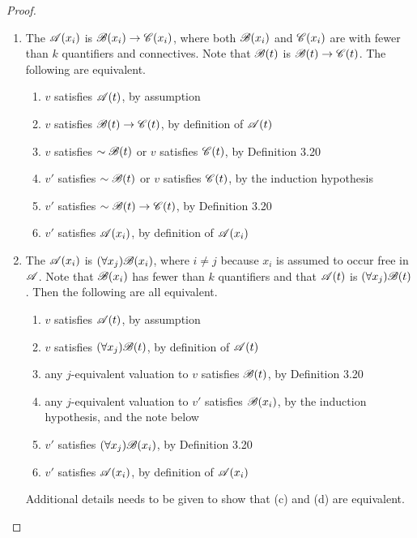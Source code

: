\begin{proposition}
\begin{proof}
\begin{enumerate}
        \item The \wf{} \(\mathscr{A}(x_i)\) is \(\mathscr{B}(x_i) \rightarrow \mathscr{C}(x_i)\), where both \(\mathscr{B}(x_i)\) and \(\mathscr{C}(x_i)\) are \wfs{} with fewer than \(k\) quantifiers and connectives. Note that \(\mathscr{B}(t)\) is \(\mathscr{B}(t) \rightarrow \mathscr{C}(t)\). The following are equivalent.
          \begin{enumerate}
            \item \(v\) satisfies \(\mathscr{A}(t)\), by assumption
            \item \(v\) satisfies \(\mathscr{B}(t) \rightarrow \mathscr{C}(t)\), by definition of \(\mathscr{A}(t)\)
            \item \(v\) satisfies \(\sim\mathscr{B}(t)\) or \(v\) satisfies \(\mathscr{C}(t)\), by Definition 3.20
            \item \(v'\) satisfies \(\sim\mathscr{B}(t)\) or \(v\) satisfies \(\mathscr{C}(t)\), by the induction hypothesis
            \item \(v'\) satisfies \(\sim\mathscr{B}(t) \rightarrow \mathscr{C}(t)\), by Definition 3.20
            \item \(v'\) satisfies \(\mathscr{A}(x_i)\), by definition of \(\mathscr{A}(x_i)\)
          \end{enumerate}

        \item The \wf{} \(\mathscr{A}(x_i)\) is \((\forall x_j)\mathscr{B}(x_i)\), where \(i \neq j\) because \(x_i\) is assumed to occur free in \(\mathscr{A}\). Note that \(\mathscr{B}(x_i)\) has fewer than \(k\) quantifiers and that \(\mathscr{A}(t)\) is \((\forall x_j)\mathscr{B}(t)\). Then the following are all equivalent.
          \begin{enumerate}
            \item \(v\) satisfies \(\mathscr{A}(t)\), by assumption
            \item \(v\) satisfies \((\forall x_j)\mathscr{B}(t)\), by definition of \(\mathscr{A}(t)\)
            \item any \(j\)-equivalent valuation to \(v\) satisfies \(\mathscr{B}(t)\), by Definition 3.20
            \item any \(j\)-equivalent valuation to \(v'\) satisfies \(\mathscr{B}(x_i)\), by the induction hypothesis, and the note below
            \item \(v'\) satisfies \((\forall x_j)\mathscr{B}(x_i)\), by Definition 3.20
            \item \(v'\) satisfies \(\mathscr{A}(x_i)\), by definition of \(\mathscr{A}(x_i)\)
          \end{enumerate}
          Additional details needs to be given to show that (c) and (d) are equivalent.


\end{enumerate}
\end{proof}
\end{proposition}
